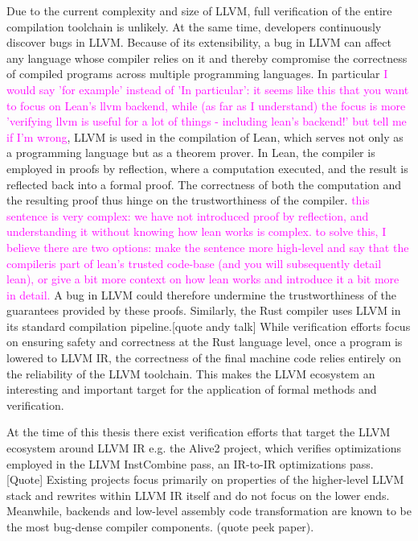 Due to the current complexity and size of LLVM, full verification of the entire compilation toolchain is unlikely. At the same time, developers continuously discover bugs in LLVM. Because of its extensibility, a bug in LLVM can affect any language whose compiler relies on it and thereby compromise the correctness of compiled programs across multiple programming languages.
In particular \textcolor{magenta}{I would say 'for example' instead of 'In particular': it seems like this that you want to focus on Lean's llvm backend, while (as far as I understand) the focus is more 'verifying llvm is useful for a lot of things - including lean's backend!' but tell me if I'm wrong}, LLVM is used in the compilation of Lean, which serves not only as a programming language but  as a theorem prover. In Lean, the compiler is employed in proofs by reflection, where a computation  executed, and the result is reflected back into a formal proof. The correctness of both the computation and the resulting proof thus hinge on the trustworthiness of the compiler. \textcolor{magenta}{this sentence is very complex: we have not introduced proof by reflection, and understanding it without knowing how lean works is complex. to solve this, I believe there are two options: make the sentence more high-level and say that the compileris part of lean's trusted code-base (and you will subsequently detail lean), or give a bit more context on how lean works and introduce it a bit more in detail.} A bug in LLVM could therefore undermine the trustworthiness of the guarantees provided by these proofs. Similarly, the Rust compiler uses LLVM in its standard compilation pipeline.[quote andy talk] While verification efforts focus on ensuring safety and correctness at the Rust language level, once a program is lowered to LLVM IR, the correctness of the final machine code relies entirely on the reliability of the LLVM toolchain. This makes the LLVM ecosystem an interesting and important target for the application of formal methods and verification.


At the time of this thesis there exist verification efforts that target the LLVM ecosystem around LLVM IR e.g. the Alive2 project, which verifies optimizations employed in the LLVM InstCombine pass, an IR-to-IR optimizations pass. [Quote]
Existing projects focus primarily on properties of the higher-level LLVM stack and rewrites within LLVM IR itself and do not focus on the lower ends. Meanwhile, backends and low-level assembly code transformation are known to be the most bug-dense compiler components. (quote peek paper). 

